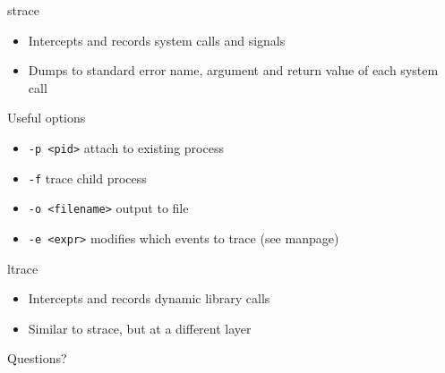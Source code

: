\documentclass[]{beamer}
\begin{document}
\begin{frame}{strace}
	\begin{itemize}
		\item Intercepts and records system calls and signals
		\item Dumps to standard error name, argument and return value of each system call
	\end{itemize}

	\begin{block}{Useful options}
		\begin{itemize}
			\item {\tt -p <pid>} attach to existing process
			\item {\tt -f} trace child process
			\item {\tt -o <filename>} output to file
			\item {\tt -e <expr>} modifies which events to trace (see manpage)
		\end{itemize}
	\end{block}
\end{frame}

\begin{frame}{ltrace}
	\begin{itemize}
		\item Intercepts and records dynamic library calls
		\item Similar to strace, but at a different layer
	\end{itemize}
\end{frame}

\begin{frame}[standout]
    Questions?
\end{frame}
\end{document}
